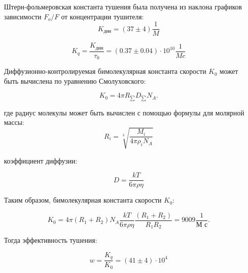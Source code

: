 \documentclass[a4paper,12pt]{article}
\begin{document}
\begin{enumerate}
Штерн-фольмеровская константа тушения была получена из наклона графиков зависимости $F_o/F$ от концентрации тушителя:
\begin{equation}
   K_{\text{дин}} = (37 \pm 4) \frac{1}{M}
\end{equation}

\begin{equation}
   K_{q} = \frac{K_{\text{дин}}}{\tau_0} = (0.37 \pm 0.04) \cdot 10^{10} \frac{1}{M c}
\end{equation}

Диффузионно-контролируемая бимолекулярная константа скорости $K_0$ может быть вычислена по уравнению Смолуховского:

\begin{equation}
   K_0 = 4 \pi R_{\sum} D_{\sum} N_A.
\end{equation}

где радиус молекулы может быть вычислен с помощью формулы для молярной массы:
\begin{equation}
   R_{i} = \sqrt[3]{\frac{M_i}{4 \pi \rho_i N_A}}
\end{equation}

коэффициент диффузии:

\begin{equation}
   D = \frac{kT}{6 \pi \rho \eta}
\end{equation}

Таким образом, бимолекулярная константа скорости $K_0$:

\begin{equation}
   K_0 = 4 \pi (R_1 + R_2) N_A \frac{kT}{6 \pi \rho \eta} \frac{(
R_1+R_2)}{R_1 R_2} = 9009 \frac{1}{\text{М с}}.
\end{equation}

Тогда эффективность тушения:

\begin{equation}
       w = \frac{K_q}{K_0} = (41 \pm 4) \cdot 10^4

\end{equation}

\end{enumerate}
\end{document}
